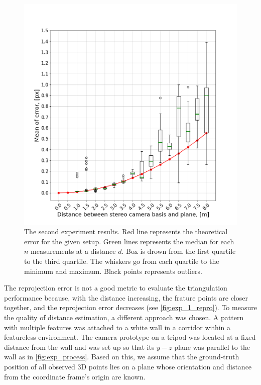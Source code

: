 \begin{figure}[ht]
    \centering
    \includegraphics[width=\textwidth]{graphics/experiment_2_general.png}
  \caption[The second experiment results.]{The second experiment results. Red line represents the theoretical error for the given setup.
  Green lines represents the median for each $n$ measurements at a distance $d$. Box is drown from the first quartile to the third quartile.
  The whiskers go from each quartile to the minimum and maximum.
  Black points represents outliers.}
  \label{fig:exp_2_general}
\end{figure}

The reprojection error is not a good metric to evaluate the triangulation performance because, with the distance increasing, the frature points are closer together, and the reprojection error decreases (see \autoref{fig:exp_1_repro}).
To measure the quality of distance estimation, a different approach was chosen.
A pattern with multiple features was attached to a white wall in a corridor within a featureless environment.
The camera prototype on a tripod was located at a fixed distance from the wall and was set up so that its $y-z$ plane was parallel to the wall as in \autoref{fig:exp_process}.
Based on this, we assume that the ground-truth position of all observed 3D points lies on a plane whose orientation and distance from the coordinate frame's origin are known.

